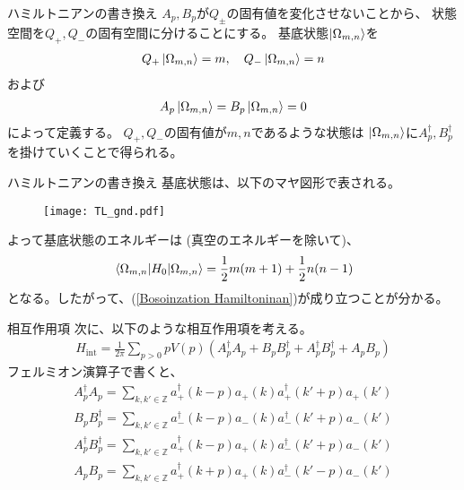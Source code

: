 \documentclass[\main/TL_liquid.tex]{subfiles}
\begin{document}
\begin{frame}{ハミルトニアンの書き換え}
    $A_p, B_p$が$Q_{\pm}$の固有値を変化させないことから、
    状態空間を$Q_+, Q_-$の固有空間に分けることにする。
    基底状態$\ket{\Omega_{m,n}}$を
    \begin{align}
        Q_+ \ket{\Omega_{m,n}} = m,
        \quad
        Q_- \ket{\Omega_{m,n}} = n
    \end{align}
    および
    \begin{align}
        A_p \ket{\Omega_{m,n}} = B_p \ket{\Omega_{m,n}} = 0
    \end{align}
    によって定義する。
    $Q_+,Q_-$の固有値が$m,n$であるような状態は
    $\ket{\Omega_{m,n}}$に$A_p^\dagger, B_p^\dagger$を掛けていくことで得られる。
\end{frame}

\begin{frame}{ハミルトニアンの書き換え}
    基底状態は、以下のマヤ図形で表される。
    \begin{figure}[H]
        \centering
        \texttt{[image: TL\_gnd.pdf]}
    \end{figure}
    よって基底状態のエネルギーは (真空のエネルギーを除いて)、
    \begin{align}
        \mel{\Omega_{m,n}}{H_0}{\Omega_{m,n}}
        = \frac{1}{2}m(m+1) + \frac{1}{2}n(n-1)
    \end{align}
    となる。したがって、(\ref{Bosoinzation Hamiltoninan})が成り立つことが分かる。
\end{frame}

\begin{frame}{相互作用項}
    次に、以下のような相互作用項を考える。
    \begin{align}
        H_{\mathrm{int}}
        = \frac{1}{2\pi} \sum_{p>0} pV(p)(
            A_p^\dagger A_p + B_p B_p^\dagger
            + A_p^\dagger B_p^\dagger + A_p B_p
        )
    \end{align}
    フェルミオン演算子で書くと、
    \begin{align}
        A_p^\dagger A_p
        = \sum_{k,k' \in \mathbb{Z}}
            a_+^\dagger(k-p) a_+(k) a_+^\dagger(k'+p) a_+(k')
        \\
        B_p B_p^\dagger
        = \sum_{k,k' \in \mathbb{Z}}
            a_-^\dagger(k-p) a_-(k) a_-^\dagger(k'+p) a_-(k')
        \\
        A_p^\dagger B_p^\dagger
        = \sum_{k,k' \in \mathbb{Z}}
            a_+^\dagger(k-p)a_+(k) a_-^\dagger(k'+p)a_-(k')
        \\
        A_p B_p
        = \sum_{k,k' \in \mathbb{Z}}
            a_+^\dagger(k+p)a_+(k) a_-^\dagger(k'-p)a_-(k')
    \end{align}
\end{frame}
\end{document}
